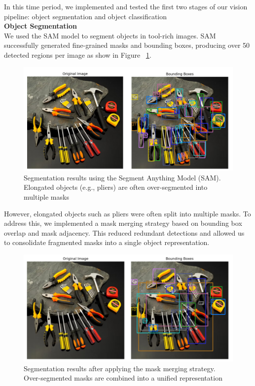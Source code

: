 \documentclass[12pt]{extarticle}
\begin{document}
In this time period, we implemented and tested the first two stages of our vision pipeline: object segmentation and object classification \\


\textbf{Object Segmentation} \\


We used the SAM model to segment objects in tool-rich images. SAM successfully generated fine-grained masks and bounding boxes, producing over 50 detected regions per image as show in Figure ~\ref{fig: sam_pre}. 

\begin{figure}[H]
    \centering
    \includegraphics[width=\linewidth]{images/sam_pre.png}
    \caption{Segmentation results using the Segment Anything Model (SAM). 
    Elongated objects (e.g., pliers) are often over-segmented into multiple masks}
    \label{fig: sam_pre}
\end{figure}

However, elongated objects such as pliers were often split into multiple masks. To address this, we implemented a mask merging strategy based on bounding box overlap and mask adjacency. This reduced redundant detections and allowed us to consolidate fragmented masks into a single object representation.

\begin{figure}[htbp]
    \centering
    \includegraphics[width=\linewidth]{images/sam_post.png}
    \caption{Segmentation results after applying the mask merging strategy. 
    Over-segmented masks are combined into a unified representation}
    \label{fig: sam_post}
\end{figure}
\end{document}
